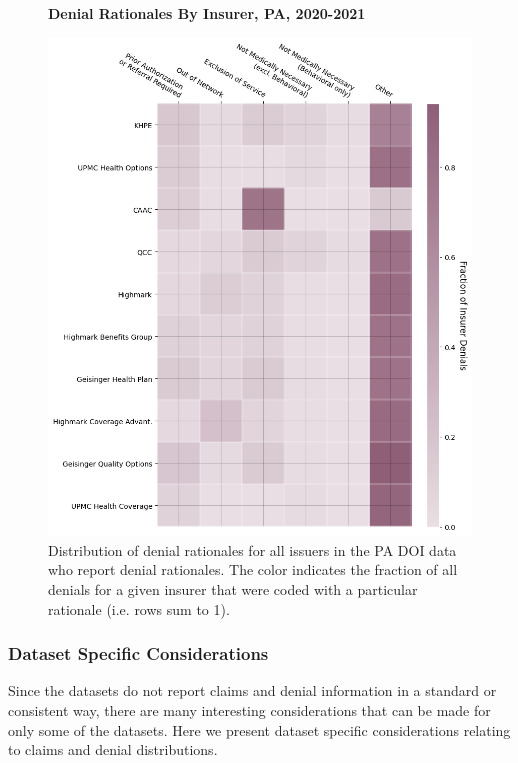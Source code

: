 \documentclass[12pt, a4paper,twoside]{report}
\theoremstyle{plain} %
\theoremstyle{definition} %
\theoremstyle{remark} %
\numberwithin{equation}{chapter}
\begin{document}
		
		\begin{figure}[h!]
			\centering
			\textbf{Denial Rationales By Insurer, PA, 2020-2021}\par\medskip
			\includegraphics[width=\columnwidth]{images/pa_claims/insurer_vs_denial_cat.png}
			\caption{Distribution of denial rationales for all issuers in the PA DOI data who report denial rationales. The color indicates the fraction of all denials for a given insurer that were coded with a particular rationale (i.e. rows sum to 1).}
			\label{padenialrationalesbyinsurer}
		\end{figure}
		
		\clearpage
		
		
		
		\subsubsection{Dataset Specific Considerations}
		
		Since the datasets do not report claims and denial information in a standard or consistent way, there are many interesting considerations that can be made for only some of the datasets. Here we present dataset specific considerations relating to claims and denial distributions.
		
\end{document}
